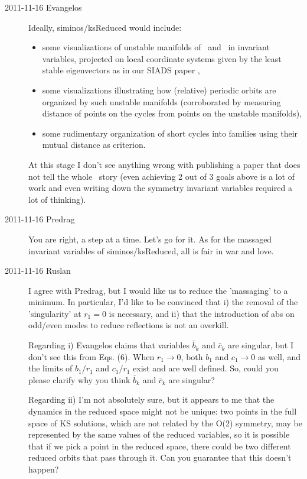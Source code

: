 \begin{description}
\item[2011-11-16 Evangelos]
Ideally, siminos/ksReduced would include:
\begin{itemize}
 \item some visualizations of unstable manifolds of \eqva\ and \reqva\
	in invariant variables, projected on local coordinate systems
	given by the least stable eigenvectors as in our
	SIADS paper ,
 \item some visualizations illustrating how (relative) periodic orbits are
	organized by such unstable manifolds (corroborated by measuring distance
	of points on the cycles from points on the unstable manifolds),
 \item some rudimentary organization of short cycles into families using
	their mutual distance as criterion.
\end{itemize}

At this stage I don't see anything wrong with publishing a paper that does
not tell the whole \KS\ story (even achieving 2 out of 3 goals above is a lot
of work and even writing down the symmetry invariant variables required a lot
of thinking).

\item[2011-11-16 Predrag] You are right, a step at a time. Let's go for
it. As for the massaged invariant variables of siminos/ksReduced, all is
fair in war and love.

\item[2011-11-16 Ruslan] I agree with Predrag, but I would like us to
reduce the 'massaging' to a minimum.  In particular, I'd like to be
convinced that i) the removal of the 'singularity' at $r_1 = 0$ is
necessary, and ii) that the introduction of abs on odd/even modes to
reduce reflections is not an overkill.

    Regarding i) Evangelos claims that variables $\bar{b}_k$ and
    $\bar{c}_k$ are singular, but I don't see this from Eqs. (6).  When
    $r_1 \to 0$, both $b_1$ and $c_1 \to 0$ as well, and the limits of
    $b_1/r_1$ and $c_1/r_1$ exist and are well defined.  So, could you
    please clarify why you think $\bar{b}_k$ and $\bar{c}_k$ are
    singular?

    Regarding ii) I'm not absolutely sure, but it appears to me that the
    dynamics in the reduced space might not be unique: two points in the
    full space of KS solutions, which are not related by the O(2)
    symmetry, may be represented by the same values of the reduced
    variables, so it is possible that if we pick a point in the reduced
    space, there could be two different reduced orbits that pass through
    it.  Can you guarantee that this doesn't happen?


\end{description}
